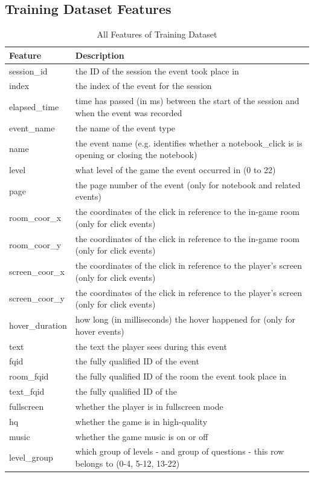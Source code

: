 \documentclass[11pt,a4paper]{article}
\begin{document}
    \subsection{Training Dataset Features}
    \label{appendix:training}
    \begin{table}[H]
        \centering
        \begin{tabular}{l|l}
            \textbf{Feature} & \textbf{Description} \\ \hline
            session\_id & the ID of the session the event took place in \\
            index & the index of the event for the session \\
            elapsed\_time & time has passed (in ms) between the start of the session and when the event was recorded \\
            event\_name & the name of the event type \\
            name & the event name (e.g. identifies whether a notebook\_click is is opening or closing the notebook) \\
            level & what level of the game the event occurred in (0 to 22) \\
            page & the page number of the event (only for notebook and related events) \\
            room\_coor\_x & the coordinates of the click in reference to the in-game room (only for click events) \\
            room\_coor\_y & the coordinates of the click in reference to the in-game room (only for click events) \\
            screen\_coor\_x & the coordinates of the click in reference to the player’s screen (only for click events) \\
            screen\_coor\_y & the coordinates of the click in reference to the player’s screen (only for click events) \\
            hover\_duration & how long (in milliseconds) the hover happened for (only for hover events) \\
            text & the text the player sees during this event \\
            fqid & the fully qualified ID of the event \\
            room\_fqid & the fully qualified ID of the room the event took place in \\
            text\_fqid & the fully qualified ID of the \\
            fullscreen & whether the player is in fullscreen mode \\
            hq & whether the game is in high-quality \\
            music & whether the game music is on or off \\
            level\_group & which group of levels - and group of questions - this row belongs to (0-4, 5-12, 13-22) \\
        \end{tabular}
        \caption{All Features of Training Dataset}
        \label{tab:training_features}
    \end{table}
    
\end{document}
